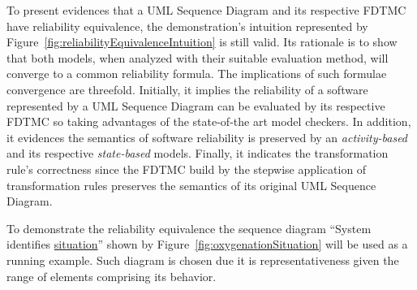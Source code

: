 
To present evidences that a UML Sequence Diagram and its respective FDTMC have
reliability equivalence, the demonstration's intuition represented by
Figure~\ref{fig:reliabilityEquivalenceIntuition} is still valid. Its rationale
is to show that both models, when analyzed with their suitable evaluation
method, will converge to a common reliability formula. The implications of
such formulae convergence are threefold. Initially, it implies the reliability
of a software represented by a UML Sequence Diagram can be evaluated by its
respective FDTMC so taking advantages of the state-of-the art model checkers.
In addition, it evidences the semantics of software reliability is preserved by
an \emph{activity-based} and its respective \emph{state-based} models. Finally,
it indicates the transformation rule's correctness since the FDTMC build by the
stepwise application of transformation rules preserves the semantics of its
original UML Sequence Diagram.

To demonstrate the reliability equivalence the sequence diagram ``System
identifies \underline{situation}'' shown by
Figure~\ref{fig:oxygenationSituation} will be used as a running example. Such
diagram is chosen due it is representativeness given the range of elements
comprising its behavior.


%
%
%

